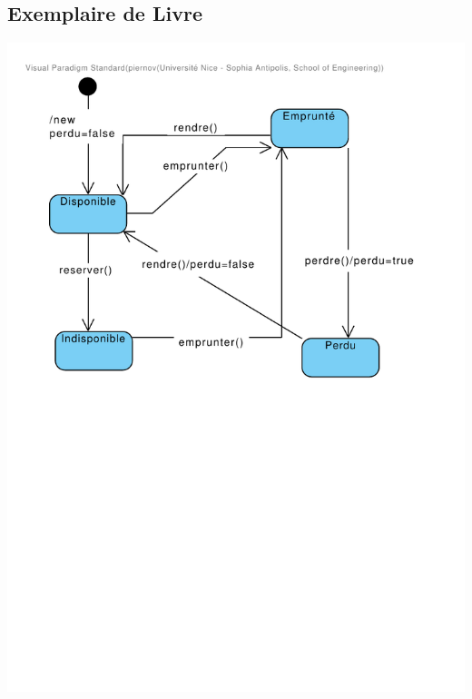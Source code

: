 \documentclass{article}
\begin{document}
\subsection{Exemplaire de Livre}
\vspace{-4em}
\hspace*{-9em}\includegraphics[scale=1.5]{state_exemplaire_de_livre}
\vspace*{-4em}
\end{document}
